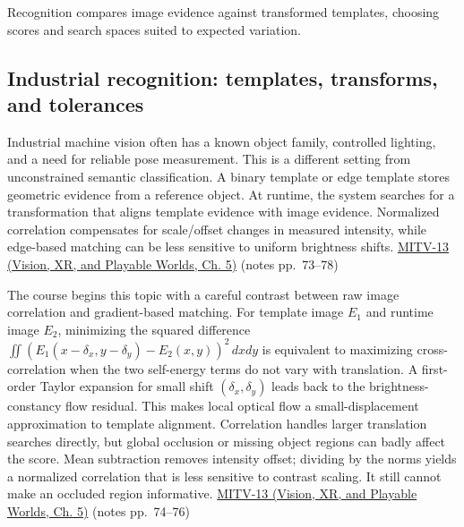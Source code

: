 \hypertarget{04-visual-computing-ii-ch030-recognition-templates-and-industrial-matching}{}

Recognition compares image evidence against transformed templates, choosing scores and search spaces suited to expected variation.

\subsection{Industrial recognition: templates, transforms, and tolerances}\label{04-visual-computing-ii-ch030-industrial-recognition-templates-transforms-and-tolerances}

\hypertarget{04-visual-computing-ii-ch030-industrial-recognition-templates-transforms-and-tolerances}{}

Industrial machine vision often has a known object family, controlled lighting, and a need for reliable pose measurement. This is a different setting from unconstrained semantic classification. A binary template or edge template stores geometric evidence from a reference object. At runtime, the system searches for a transformation that aligns template evidence with image evidence. Normalized correlation compensates for scale/offset changes in measured intensity, while edge-based matching can be less sensitive to uniform brightness shifts. \href{../07-Vision-XR-and-Playable-Worlds/main.pdf\#nameddest=04-visual-computing-ii-ch036-mitv-13---object-detection-recognition-and-pose-determination-patquick-us-7016539}{MITV-13 (Vision, XR, and Playable Worlds, Ch. 5)} (notes pp.~73--78)

The course begins this topic with a careful contrast between raw image correlation and gradient-based matching. For template image \(E_1\) and runtime image \(E_2\), minimizing the squared difference \(\iint(E_1(x-\delta_x,y-\delta_y)-E_2(x,y))^2\,dxdy\) is equivalent to maximizing cross-correlation when the two self-energy terms do not vary with translation. A first-order Taylor expansion for small shift \((\delta_x,\delta_y)\) leads back to the brightness-constancy flow residual. This makes local optical flow a small-displacement approximation to template alignment. Correlation handles larger translation searches directly, but global occlusion or missing object regions can badly affect the score. Mean subtraction removes intensity offset; dividing by the norms yields a normalized correlation that is less sensitive to contrast scaling. It still cannot make an occluded region informative. \href{../07-Vision-XR-and-Playable-Worlds/main.pdf\#nameddest=04-visual-computing-ii-ch036-mitv-13---object-detection-recognition-and-pose-determination-patquick-us-7016539}{MITV-13 (Vision, XR, and Playable Worlds, Ch. 5)} (notes pp.~74--76)

